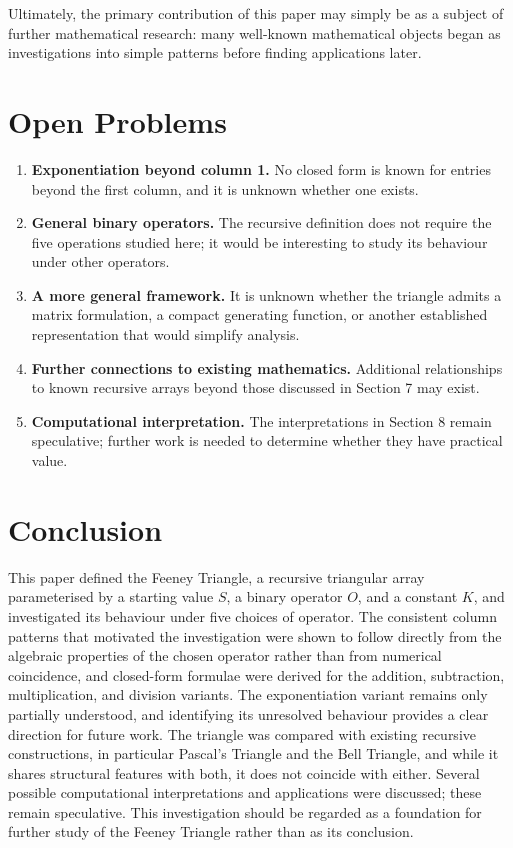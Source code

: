 \documentclass[11pt]{article}
\theoremstyle{definition}
\begin{document}
Ultimately, the primary contribution of this paper may simply be as a subject of further mathematical research: many well-known mathematical objects began as investigations into simple patterns before finding applications later.

\section{Open Problems}

\begin{enumerate}[leftmargin=*]
\item \textbf{Exponentiation beyond column 1.} No closed form is known for entries beyond the first column, and it is unknown whether one exists.
\item \textbf{General binary operators.} The recursive definition does not require the five operations studied here; it would be interesting to study its behaviour under other operators.
\item \textbf{A more general framework.} It is unknown whether the triangle admits a matrix formulation, a compact generating function, or another established representation that would simplify analysis.
\item \textbf{Further connections to existing mathematics.} Additional relationships to known recursive arrays beyond those discussed in Section 7 may exist.
\item \textbf{Computational interpretation.} The interpretations in Section 8 remain speculative; further work is needed to determine whether they have practical value.
\end{enumerate}

\section{Conclusion}

This paper defined the Feeney Triangle, a recursive triangular array parameterised by a starting value $S$, a binary operator $O$, and a constant $K$, and investigated its behaviour under five choices of operator. The consistent column patterns that motivated the investigation were shown to follow directly from the algebraic properties of the chosen operator rather than from numerical coincidence, and closed-form formulae were derived for the addition, subtraction, multiplication, and division variants. The exponentiation variant remains only partially understood, and identifying its unresolved behaviour provides a clear direction for future work. The triangle was compared with existing recursive constructions, in particular Pascal's Triangle and the Bell Triangle, and while it shares structural features with both, it does not coincide with either. Several possible computational interpretations and applications were discussed; these remain speculative. This investigation should be regarded as a foundation for further study of the Feeney Triangle rather than as its conclusion.
\end{document}
